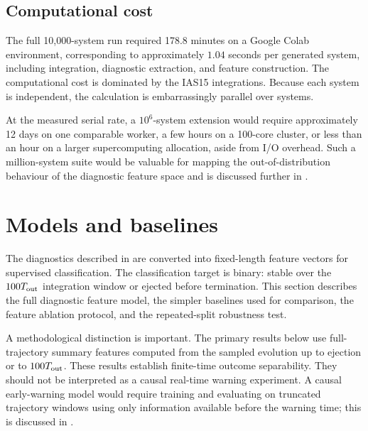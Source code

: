 \documentclass[12pt,a4paper]{article}
\newcommand{\Tout}{T_{\rm out}}
\begin{document}
\subsection{Computational cost}
\label{sec:computational_cost}

The full 10,000-system run required 178.8 minutes on a Google Colab environment, corresponding to approximately \(1.04\) seconds per generated system, including integration, diagnostic extraction, and feature construction. The computational cost is dominated by the IAS15 integrations. Because each system is independent, the calculation is embarrassingly parallel over systems.

At the measured serial rate, a \(10^6\)-system extension would require approximately 12 days on one comparable worker, a few hours on a 100-core cluster, or less than an hour on a larger supercomputing allocation, aside from I/O overhead. Such a million-system suite would be valuable for mapping the out-of-distribution behaviour of the diagnostic feature space and is discussed further in .


\section{Models and baselines}
\label{sec:models_baselines}

The diagnostics described in  are converted into fixed-length feature vectors for supervised classification. The classification target is binary: stable over the \(100\Tout\) integration window or ejected before termination. This section describes the full diagnostic feature model, the simpler baselines used for comparison, the feature ablation protocol, and the repeated-split robustness test.

A methodological distinction is important. The primary results below use full-trajectory summary features computed from the sampled evolution up to ejection or to \(100\Tout\). These results establish finite-time outcome separability. They should not be interpreted as a causal real-time warning experiment. A causal early-warning model would require training and evaluating on truncated trajectory windows using only information available before the warning time; this is discussed in .
\end{document}

